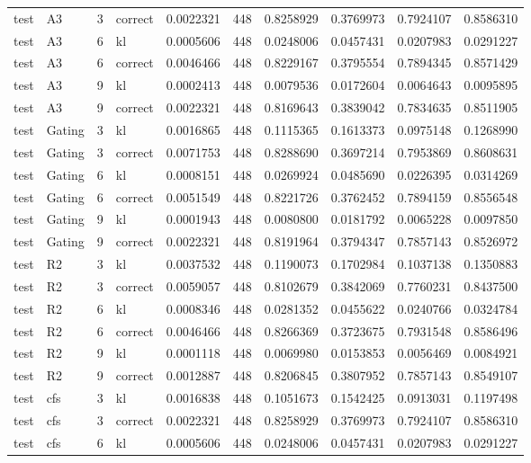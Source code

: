 \begin{tabular}{llrlrrrrrr}
test & A3 & 3 & correct & 0.0022321 & 448 & 0.8258929 & 0.3769973 & 0.7924107 & 0.8586310 \\
test & A3 & 6 & kl & 0.0005606 & 448 & 0.0248006 & 0.0457431 & 0.0207983 & 0.0291227 \\
test & A3 & 6 & correct & 0.0046466 & 448 & 0.8229167 & 0.3795554 & 0.7894345 & 0.8571429 \\
test & A3 & 9 & kl & 0.0002413 & 448 & 0.0079536 & 0.0172604 & 0.0064643 & 0.0095895 \\
test & A3 & 9 & correct & 0.0022321 & 448 & 0.8169643 & 0.3839042 & 0.7834635 & 0.8511905 \\
test & Gating & 3 & kl & 0.0016865 & 448 & 0.1115365 & 0.1613373 & 0.0975148 & 0.1268990 \\
test & Gating & 3 & correct & 0.0071753 & 448 & 0.8288690 & 0.3697214 & 0.7953869 & 0.8608631 \\
test & Gating & 6 & kl & 0.0008151 & 448 & 0.0269924 & 0.0485690 & 0.0226395 & 0.0314269 \\
test & Gating & 6 & correct & 0.0051549 & 448 & 0.8221726 & 0.3762452 & 0.7894159 & 0.8556548 \\
test & Gating & 9 & kl & 0.0001943 & 448 & 0.0080800 & 0.0181792 & 0.0065228 & 0.0097850 \\
test & Gating & 9 & correct & 0.0022321 & 448 & 0.8191964 & 0.3794347 & 0.7857143 & 0.8526972 \\
test & R2 & 3 & kl & 0.0037532 & 448 & 0.1190073 & 0.1702984 & 0.1037138 & 0.1350883 \\
test & R2 & 3 & correct & 0.0059057 & 448 & 0.8102679 & 0.3842069 & 0.7760231 & 0.8437500 \\
test & R2 & 6 & kl & 0.0008346 & 448 & 0.0281352 & 0.0455622 & 0.0240766 & 0.0324784 \\
test & R2 & 6 & correct & 0.0046466 & 448 & 0.8266369 & 0.3723675 & 0.7931548 & 0.8586496 \\
test & R2 & 9 & kl & 0.0001118 & 448 & 0.0069980 & 0.0153853 & 0.0056469 & 0.0084921 \\
test & R2 & 9 & correct & 0.0012887 & 448 & 0.8206845 & 0.3807952 & 0.7857143 & 0.8549107 \\
test & cfs & 3 & kl & 0.0016838 & 448 & 0.1051673 & 0.1542425 & 0.0913031 & 0.1197498 \\
test & cfs & 3 & correct & 0.0022321 & 448 & 0.8258929 & 0.3769973 & 0.7924107 & 0.8586310 \\
test & cfs & 6 & kl & 0.0005606 & 448 & 0.0248006 & 0.0457431 & 0.0207983 & 0.0291227 \\

\end{tabular}
